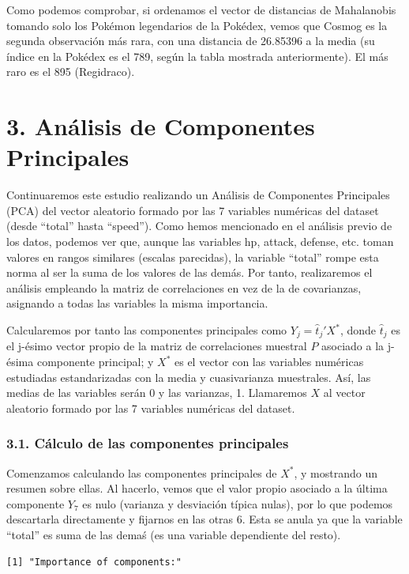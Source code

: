 \documentclass[
  12pt,
]{extreport}
\begin{document}
Como podemos comprobar, si ordenamos el vector de distancias de
Mahalanobis tomando solo los Pokémon legendarios de la Pokédex, vemos
que Cosmog es la segunda observación más rara, con una distancia de
26.85396 a la media (su índice en la Pokédex es el 789, según la tabla
mostrada anteriormente). El más raro es el 895 (Regidraco).

\chapter{3. Análisis de Componentes
Principales}\label{anuxe1lisis-de-componentes-principales}

Continuaremos este estudio realizando un Análisis de Componentes
Principales (PCA) del vector aleatorio formado por las 7 variables
numéricas del dataset (desde ``total'' hasta ``speed''). Como hemos
mencionado en el análisis previo de los datos, podemos ver que, aunque
las variables hp, attack, defense, etc. toman valores en rangos
similares (escalas parecidas), la variable ``total'' rompe esta norma al
ser la suma de los valores de las demás. Por tanto, realizaremos el
análisis empleando la matriz de correlaciones en vez de la de
covarianzas, asignando a todas las variables la misma importancia.

Calcularemos por tanto las componentes principales como
\(Y_j = \hat{t}_j'X^*\), donde \(\hat{t}_j\) es el j-ésimo vector propio
de la matriz de correlaciones muestral \(P\) asociado a la j-ésima
componente principal; y \(X^*\) es el vector con las variables numéricas
estudiadas estandarizadas con la media y cuasivarianza muestrales. Así,
las medias de las variables serán 0 y las varianzas, 1. Llamaremos \(X\)
al vector aleatorio formado por las 7 variables numéricas del dataset.

\subsection{3.1. Cálculo de las componentes
principales}\label{cuxe1lculo-de-las-componentes-principales}

Comenzamos calculando las componentes principales de \(X^*\), y
mostrando un resumen sobre ellas. Al hacerlo, vemos que el valor propio
asociado a la última componente \(Y_7\) es nulo (varianza y desviación
típica nulas), por lo que podemos descartarla directamente y fijarnos en
las otras 6. Esta se anula ya que la variable ``total'' es suma de las
demaś (es una variable dependiente del resto).

\begin{verbatim}
[1] "Importance of components:"
\end{verbatim}
\end{document}
